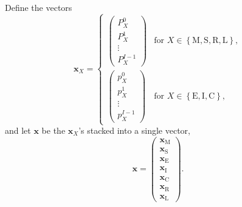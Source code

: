 \documentclass[12pt]{article}
\renewcommand{\vec}[1]{\mathbf{#1}}
\begin{document}
Define the vectors
\begin{equation}
  \vec{x}_X =
  \begin{cases}
    \begin{pmatrix}
      P_X^0\\
      P_X^1\\
      \vdots\\
      P_X^{I - 1}
    \end{pmatrix}
    &
    \text{for $X \in
      \left\{\mathrm{M}, \mathrm{S}, \mathrm{R}, \mathrm{L}\right\}$},
    \\[4em]
    \begin{pmatrix}
      p_X^0\\
      p_X^1\\
      \vdots\\
      p_X^{I - 1}
    \end{pmatrix}
    &
    \text{for $X \in
      \left\{\mathrm{E}, \mathrm{I}, \mathrm{C}\right\}$},
  \end{cases}
\end{equation}
and let $\vec{x}$ be the $\vec{x}_X$'s stacked into a single vector,
\begin{equation}
  \vec{x} =
  \begin{pmatrix}
    \vec{x}_{\mathrm{M}}\\
    \vec{x}_{\mathrm{S}}\\
    \vec{x}_{\mathrm{E}}\\
    \vec{x}_{\mathrm{I}}\\
    \vec{x}_{\mathrm{C}}\\
    \vec{x}_{\mathrm{R}}\\
    \vec{x}_{\mathrm{L}}
  \end{pmatrix}.
\end{equation}
\end{document}
